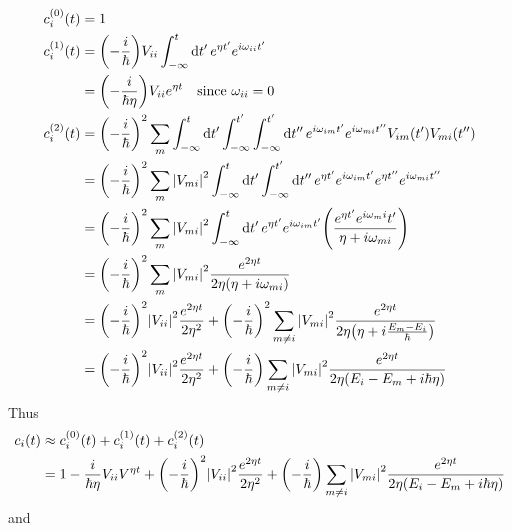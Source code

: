 \documentclass[12pt,a4paper,titlepage]{article}
\begin{document}
\begin{equation}
\begin{aligned}
c_{i}^{(0)}(t)&=1\\
c_{i}^{(1)}(t)&=\qty(-\frac{i}{\hbar})V_{ii}\int_{-\infty}^{t}\dd{t'}e^{\eta t'}e^{i\omega_{ii}t'}\\
&=\qty(-\frac{i}{\hbar\eta})V_{ii}e^{\eta t}\qq{since $\omega_{ii}=0$}\\
c_{i}^{(2)}(t)&=\qty(-\frac{i}{\hbar})^{2}\sum_{m}\int_{-\infty}^{t}\dd{t'}\int_{-\infty}^{t'}\int_{-\infty}^{t'}\dd{t''}e^{i\omega_{im}t'}e^{i\omega_{mi}t''}V_{im}(t')V_{mi}(t'')\\
&=\qty(-\frac{i}{\hbar})^{2}\sum_{m}\abs{V_{mi}}^{2}\int_{-\infty}^{t}\dd{t'}\int_{-\infty}^{t'}\dd{t''}e^{\eta t'}e^{i\omega_{im}t'}e^{\eta t''}e^{i\omega_{mi}t''}\\
&=\qty(-\frac{i}{\hbar})^{2}\sum_{m}\abs{V_{mi}}^{2}\int_{-\infty}^{t}\dd{t'}e^{\eta t'}e^{i\omega_{im}t'}\qty(\frac{e^{\eta t'}e^{i\omega_mi}t'}{\eta+i\omega_{mi}})\\
&=\qty(-\frac{i}{\hbar})^{2}\sum_{m}\abs{V_{mi}}^{2}\frac{e^{2\eta t}}{2\eta(\eta+i\omega_{mi})}\\
&=\qty(-\frac{i}{\hbar})^{2}\abs{V_{ii}}^{2}\frac{e^{2\eta t}}{2\eta^{2}}+\qty(-\frac{i}{\hbar})^{2}\sum_{m\neq i}\abs{V_{mi}}^{2}\frac{e^{2\eta t}}{2\eta\qty(\eta+i\frac{E_{m}-E_{i}}{\hbar})}\\
&=\qty(-\frac{i}{\hbar})^{2}\abs{V_{ii}}^{2}\frac{e^{2\eta t}}{2\eta^{2}}+\qty(-\frac{i}{\hbar})\sum_{m\neq i}\abs{V_{mi}}^{2}\frac{e^{2\eta t}}{2\eta(E_{i}-E_{m}+i\hbar\eta)}
\end{aligned}
\end{equation}
Thus
\begin{equation}
\begin{aligned}
c_{i}(t)&\approx c_{i}^{(0)}(t)+c_{i}^{(1)}(t)+c_{i}^{(2)}(t)\\
&=1-\frac{i}{\hbar\eta}V_{ii}V^{\eta t}+\qty(-\frac{i}{\hbar})^{2}\abs{V_{ii}}^{2}\frac{e^{2\eta t}}{2\eta^{2}}+\qty(-\frac{i}{\hbar})\sum_{m\neq i}\abs{V_{mi}}^{2}\frac{e^{2\eta t}}{2\eta(E_{i}-E_{m}+i\hbar\eta)}
\end{aligned}
\end{equation}
and
\end{document}
